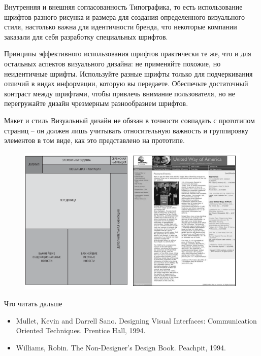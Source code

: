 \documentclass{beamer}
\begin{document}
\begin{frame}[t]{Внутренняя и внешняя согласованность}
Типографика, то есть использование шрифтов разного рисунка и размера для создания определенного визуального стиля, настолько важна для идентичности бренда, что некоторые компании заказали для себя разработку специальных шрифтов. 

Принципы эффективного использования шрифтов практически те же, что и для остальных аспектов визуального дизайна: 
не применяйте похожие, но неидентичные шрифты. 
Используйте разные шрифты только для подчеркивания отличий в видах информации, которую вы передаете.
Обеспечьте достаточный контраст между шрифтами, чтобы привлечь внимание пользователя, но не перегружайте дизайн чрезмерным разнообразием шрифтов.
\end{frame}

\begin{frame}[t]{Макет и стиль}
	Визуальный дизайн не обязан в точности совпадать с прототипом страниц – он должен лишь учитывать относительную важность и группировку элементов в том виде, как это представлено на прототипе.
	\begin{figure}[h]
		\centering
		\includegraphics[scale=0.5]{images/lec05-pic04.png}
	\end{figure}
\end{frame} 

\begin{frame}[t]{Что читать дальше}
	\begin{itemize}
		\item Mullet, Kevin and Darrell Sano. Designing Visual Interfaces: Communication Oriented Techniques. Prentice Hall, 1994.
		\item Williams, Robin. The Non-Designer's Design Book. Peachpit, 1994.
	\end{itemize}
\end{frame}
\end{document}
